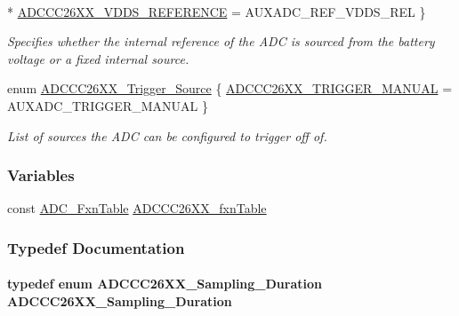 \begin{DoxyCompactItemize}
\\*
\hyperlink{_a_d_c_c_c26_x_x_8h_a5ed293d16be70036c4008865dbe33b98a2591afa01edb684501f9c60f646e2dbb}{A\+D\+C\+C\+C26\+X\+X\+\_\+\+V\+D\+D\+S\+\_\+\+R\+E\+F\+E\+R\+E\+N\+C\+E} = A\+U\+X\+A\+D\+C\+\_\+\+R\+E\+F\+\_\+\+V\+D\+D\+S\+\_\+\+R\+E\+L
 \}
\begin{DoxyCompactList}\small\item\em Specifies whether the internal reference of the A\+D\+C is sourced from the battery voltage or a fixed internal source. \end{DoxyCompactList}\item 
enum \hyperlink{_a_d_c_c_c26_x_x_8h_ac122319c50b5f443f4d3254a2b2d58f0}{A\+D\+C\+C\+C26\+X\+X\+\_\+\+Trigger\+\_\+\+Source} \{ \hyperlink{_a_d_c_c_c26_x_x_8h_ac122319c50b5f443f4d3254a2b2d58f0aafe64b4149875b946350262169812030}{A\+D\+C\+C\+C26\+X\+X\+\_\+\+T\+R\+I\+G\+G\+E\+R\+\_\+\+M\+A\+N\+U\+A\+L} = A\+U\+X\+A\+D\+C\+\_\+\+T\+R\+I\+G\+G\+E\+R\+\_\+\+M\+A\+N\+U\+A\+L
 \}
\begin{DoxyCompactList}\small\item\em List of sources the A\+D\+C can be configured to trigger off of. \end{DoxyCompactList}\end{DoxyCompactItemize}
\subsubsection*{Variables}
\begin{DoxyCompactItemize}
\item 
const \hyperlink{struct_a_d_c___fxn_table}{A\+D\+C\+\_\+\+Fxn\+Table} \hyperlink{_a_d_c_c_c26_x_x_8h_a4e18261700c8a99141f2507c54c13227}{A\+D\+C\+C\+C26\+X\+X\+\_\+fxn\+Table}
\end{DoxyCompactItemize}


\subsubsection{Typedef Documentation}
\paragraph[{A\+D\+C\+C\+C26\+X\+X\+\_\+\+Sampling\+\_\+\+Duration}]{\setlength{\rightskip}{0pt plus 5cm}typedef enum {\bf A\+D\+C\+C\+C26\+X\+X\+\_\+\+Sampling\+\_\+\+Duration}  {\bf A\+D\+C\+C\+C26\+X\+X\+\_\+\+Sampling\+\_\+\+Duration}}\label{_a_d_c_c_c26_x_x_8h_a267282cd7cedc4f9562dd5ed3e112b7b}


